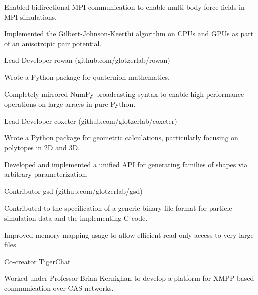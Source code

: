 \begin{cventries}
{\begin{cvitems}
        \item Enabled bidirectional MPI communication to enable multi-body force fields in MPI simulations.
        \item Implemented the Gilbert-Johnson-Keerthi algorithm on CPUs and GPUs as part of an anisotropic pair potential.
      \end{cvitems}
    }
\ifextended
  \cventry
    {Lead Developer} %
    {rowan ({\tiny github.com/glotzerlab/rowan})} %
    {} %
    {} %
    {
      \begin{cvitems} %
        \item Wrote a Python package for quaternion mathematics.
        \item Completely mirrored NumPy broadcasting syntax to enable high-performance operations on large arrays in pure Python.
      \end{cvitems}
    }
  \cventry
    {Lead Developer} %
    {coxeter ({\tiny github.com/glotzerlab/coxeter})} %
    {} %
    {} %
    {
      \begin{cvitems} %
        \item Wrote a Python package for geometric calculations, particularly focusing on polytopes in 2D and 3D.
        \item Developed and implemented a unified API for generating families of shapes via arbitrary parameterization.
      \end{cvitems}
    }
  \cventry
    {Contributor} %
    {gsd ({\tiny github.com/glotzerlab/gsd})} %
    {} %
    {} %
    {
      \begin{cvitems} %
        \item Contributed to the specification of a generic binary file format for particle simulation data and the implementing C code.
        \item Improved memory mapping usage to allow efficient read-only access to very large files.
      \end{cvitems}
    }
\fi
\ifoutdated
  \cventry
    {Co-creator} %
    {TigerChat} %
    {} %
    {} %
    {
      \begin{cvitems} %
      \item Worked under Professor Brian Kernighan to develop a platform for XMPP-based communication over CAS networks.
      \end{cvitems}
    }
\fi
\end{cventries}
